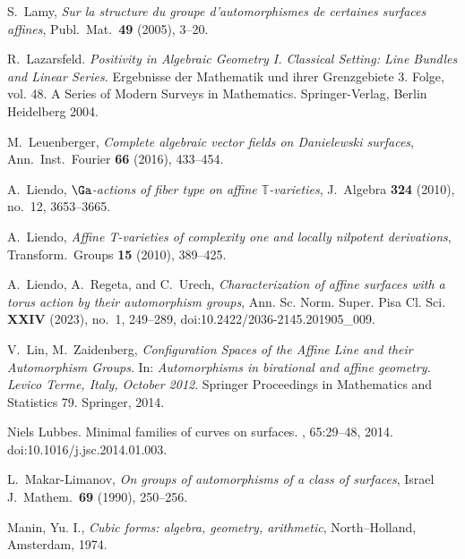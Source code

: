 S.~Lamy,
\emph{Sur la structure du groupe d'automorphismes
de certaines surfaces affines},
Publ.\ Mat.\ \textbf{49} (2005),  3--20.

R.~Lazarsfeld.
\emph{Positivity
in Algebraic Geometry I.
Classical Setting:
Line Bundles and Linear Series.}
Ergebnisse der Mathematik und ihrer Grenzgebiete
3. Folge, vol. 48.
A Series of Modern Surveys in Mathematics.
Springer-Verlag, Berlin Heidelberg 2004.

M.~Leuenberger, \emph{ Complete algebraic vector fields on Danielewski surfaces}, Ann.\ Inst.\ Fourier  \textbf{66} (2016),  433--454.

A.~Liendo,
\emph{$\Ga$-actions of fiber type on affine $\mathbb{T}$-varieties},
J.\ Algebra \textbf{324} (2010), no.~12, 3653--3665.

A.~Liendo,  \emph{Affine T-varieties of complexity one and locally nilpotent derivations},
Transform.\ Groups \textbf{15} (2010), 389--425.

A.~Liendo, A.~Regeta, and C.~Urech, \emph{Characterization of affine surfaces with a torus action by their automorphism groups},  Ann. Sc. Norm. Super. Pisa Cl. Sci. \textbf{XXIV} (2023), no.~1, 249--289,  doi:10.2422/2036-2145.201905\_009.


V.~Lin, M.~Zaidenberg, \emph{Configuration Spaces of the Affine Line
and their Automorphism Groups}.
In: \emph{Automorphisms in birational and affine geometry. Levico Terme, Italy, October 2012}.
Springer Proceedings in Mathematics and Statistics 79. Springer, 2014.

Niels Lubbes.
\newblock Minimal families of curves on surfaces.
, 65:29--48, 2014.
\newblock doi:10.1016/j.jsc.2014.01.003.

L.~Makar-Limanov, \emph{On groups of automorphisms of a class of surfaces},
Israel J.\ Mathem.\ \textbf{69} (1990), 250--256.


Manin, Yu. I., \emph{Cubic forms: algebra, geometry, arithmetic}, North--Holland, Amsterdam, 1974.

